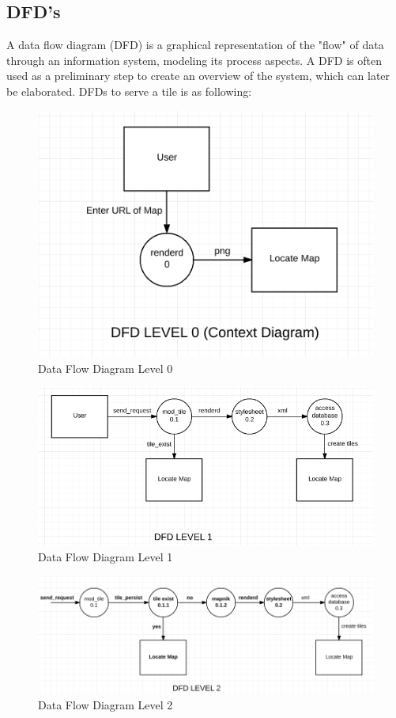 \subsection{DFD's}
A data flow diagram (DFD) is a graphical representation of the "flow" of data through an information system, modeling its process aspects. A DFD is often used as a preliminary step to create an overview of the system, which can later be elaborated. DFDs to serve a tile is as following:
\begin{figure}[h!]
	\centering
	\includegraphics[scale=0.6]{input/images/DFD_0.png}
	\caption{Data Flow Diagram Level 0}
\end{figure}
\begin{figure}[h!]
	        \centering
		        \includegraphics[scale=0.6]{input/images/DFD_1.png}
			        \caption{Data Flow Diagram Level 1}
\end{figure}
\begin{figure}[h!]
	        \centering
		        \includegraphics[scale=0.5]{input/images/DFD_2.png}
			        \caption{Data Flow Diagram Level 2}
\end{figure}

